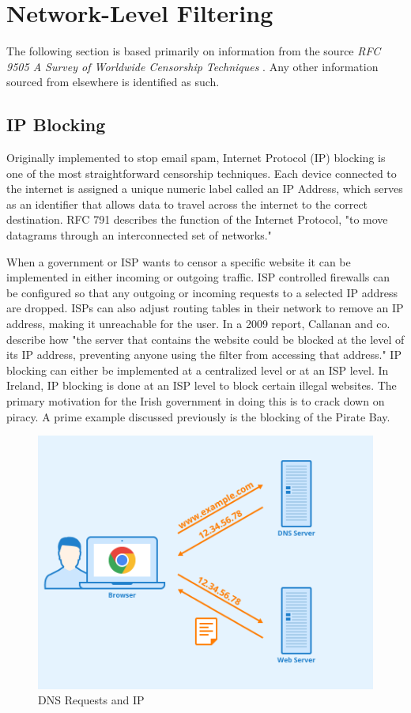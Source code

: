 \section{Network-Level Filtering}
The following section is based primarily on information from the source \textit{RFC 9505 A Survey of Worldwide Censorship Techniques} \cite{rfc9505}. Any other information sourced from elsewhere is identified as such.

\subsection{IP Blocking}
Originally implemented to stop email spam, Internet Protocol (IP) blocking is one of the most straightforward censorship techniques. Each device connected to the internet is assigned a unique numeric label called an IP Address, which serves as an identifier that allows data to travel across the internet to the correct destination. RFC 791 describes the function of the Internet Protocol, "to move datagrams through an interconnected set of networks." \cite{rfc791}

When a government or ISP wants to censor a specific website it can be implemented in either incoming or outgoing traffic. ISP controlled firewalls can be configured so that any outgoing or incoming requests to a selected IP address are dropped. ISPs can also adjust routing tables in their network to remove an IP address, making it unreachable for the user. In a 2009 report, Callanan and co. describe how "the server that contains the website could be blocked at the level of its IP address, preventing anyone using the filter from accessing that address." \cite{inthemis2025internet} IP blocking can either be implemented at a centralized level or at an ISP level. In Ireland, IP blocking is done at an ISP level to block certain illegal websites. The primary motivation for the Irish government in doing this is to crack down on piracy. A prime example discussed previously is the blocking of the Pirate Bay. \cite{piratebay_block2013}

\begin{figure}
    \centering
    \includegraphics[width=0.5\linewidth]{State of the Art/DNS.png}
    \caption{DNS Requests and IP}
    \label{fig:enter-label}
\end{figure}


